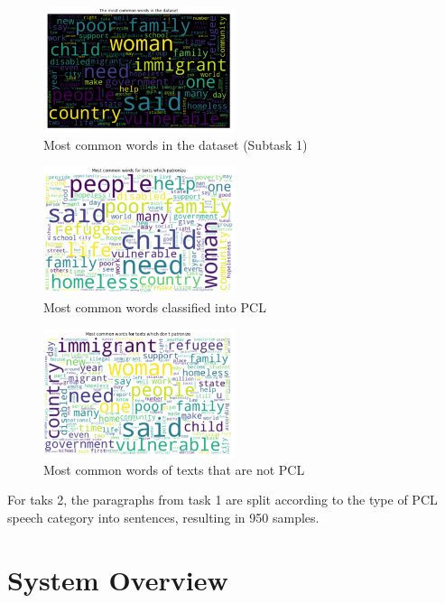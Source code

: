 \documentclass[11pt]{article}
\begin{document}
\begin{figure}[h]
\centering
\includegraphics[width=0.5\textwidth]{common.png}
\caption{Most common words in the dataset (Subtask 1)}
\label{fig2}
\end{figure}

\begin{figure}[h]
\centering
\includegraphics[width=0.5\textwidth]{pcl.png}
\caption{Most common words classified into PCL}
\label{fig3}
\end{figure}

\begin{figure}[h]
\centering
\includegraphics[width=0.5\textwidth]{nopcl.png}
\caption{Most common words of texts that are not PCL}
\label{fig4}
\end{figure}



For taks 2, the paragraphs from task 1 are split according to the type of PCL speech category into sentences, resulting in 950 samples.

\section{System Overview}
\end{document}
